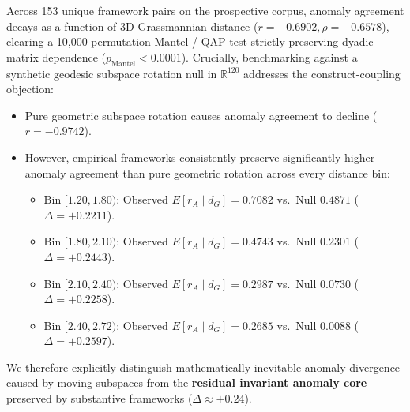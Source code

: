 Across 153 unique framework pairs on the prospective corpus, anomaly agreement decays as a function of 3D Grassmannian distance ($r = -0.6902, \rho = -0.6578$), clearing a 10,000-permutation Mantel / QAP test strictly preserving dyadic matrix dependence ($p_{\text{Mantel}} < \mathbf{0.0001}$).
Crucially, benchmarking against a synthetic geodesic subspace rotation null in $\mathbb{R}^{120}$ addresses the construct-coupling objection:
\begin{itemize}
    \item Pure geometric subspace rotation causes anomaly agreement to decline ($r = -0.9742$).
    \item However, empirical frameworks consistently preserve significantly higher anomaly agreement than pure geometric rotation across every distance bin:
    \begin{itemize}
        \item Bin $[1.20, 1.80)$: Observed $E[r_A \mid d_G] = 0.7082$ vs.\ Null $0.4871$ ($\Delta = \mathbf{+0.2211}$).
        \item Bin $[1.80, 2.10)$: Observed $E[r_A \mid d_G] = 0.4743$ vs.\ Null $0.2301$ ($\Delta = \mathbf{+0.2443}$).
        \item Bin $[2.10, 2.40)$: Observed $E[r_A \mid d_G] = 0.2987$ vs.\ Null $0.0730$ ($\Delta = \mathbf{+0.2258}$).
        \item Bin $[2.40, 2.72)$: Observed $E[r_A \mid d_G] = 0.2685$ vs.\ Null $0.0088$ ($\Delta = \mathbf{+0.2597}$).
    \end{itemize}
\end{itemize}
We therefore explicitly distinguish mathematically inevitable anomaly divergence caused by moving subspaces from the \textbf{residual invariant anomaly core} preserved by substantive frameworks ($\Delta \approx +0.24$).

